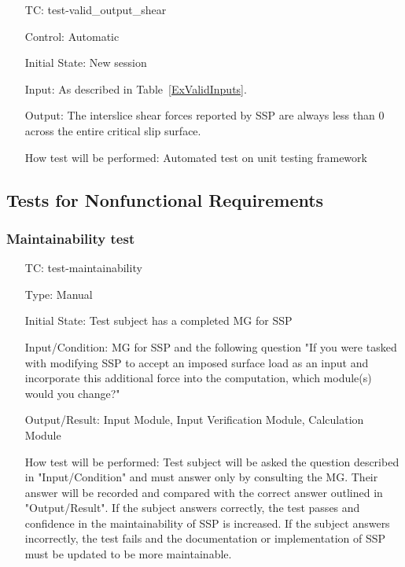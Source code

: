\documentclass[12pt, titlepage]{article}
\newcounter{testnum} %
\newcommand{\progname}{SSP}
\begin{document}
\begin{enumerate}[label=TC\arabic*:,ref={\arabic*}]
Input: As described in Table~\ref{ExValidInputs}.

Output: The interslice normal forces reported by \progname{} are always greater 
than 0 across the entire critical slip surface.

How test will be performed: Automated test on unit testing framework

\item [TC\refstepcounter{testnum}\thetestnum: \label{TC_ValidOutShear}] 
test-valid\_output\_shear

Control: Automatic

Initial State: New session

Input: As described in Table~\ref{ExValidInputs}.

Output: The interslice shear forces reported by \progname{} are always less 
than 0 across the entire critical slip surface.

How test will be performed: Automated test on unit testing framework
	
\end{enumerate}

\subsection{Tests for Nonfunctional Requirements} \label{sec_NFRTests}

\subsubsection{Maintainability test}

\begin{enumerate}[label=TC\arabic*:,ref={\arabic*}]
	
\item [TC\refstepcounter{testnum}\thetestnum: \label{TC_Maintainability}] 
test-maintainability

Type: Manual
					
Initial State: Test subject has a completed MG for \progname{}
					
Input/Condition: MG for \progname{} and the following question "If you were 
tasked with modifying \progname{} to accept an imposed surface load as an input 
and incorporate this additional force into the computation, which module(s) 
would you change?"
					
Output/Result: Input Module, Input Verification Module, Calculation Module

					
How test will be performed: Test subject will be asked the question described 
in "Input/Condition" and must answer only by consulting the MG. Their answer 
will be recorded and compared with the correct answer outlined in 
"Output/Result". If the subject answers correctly, the test passes and 
confidence in the maintainability of \progname{} is increased. If the subject 
answers incorrectly, the test fails and the documentation or implementation of 
\progname{} must be updated to be more maintainable.
					
\end{enumerate}
\end{document}
